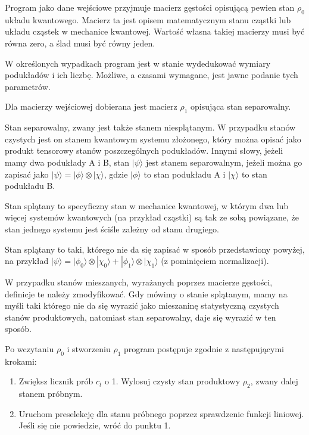 \documentclass[11pt, a4paper]{article}
\begin{document}
\begin{sloppypar}
    Program jako dane wejściowe przyjmuje macierz gęstości opisującą pewien stan $\rho_{0}$
    układu kwantowego. Macierz ta jest opisem matematycznym stanu cząstki lub układu
    cząstek w mechanice kwantowej. Wartość własna takiej macierzy musi być równa zero, a
    ślad musi być równy jeden.

    W określonych wypadkach program jest w stanie wydedukować wymiary podukładów i ich
    liczbę. Możliwe, a czasami wymagane, jest jawne podanie tych parametrów.

    Dla macierzy wejściowej dobierana jest macierz $\rho_{1}$ opisująca stan separowalny.

    Stan separowalny, zwany jest także stanem niesplątanym. W przypadku stanów czystych jest
    on stanem kwantowym systemu złożonego, który można opisać jako produkt tensorowy
    stanów poszczególnych podukładów. Innymi słowy, jeżeli mamy dwa podukłady A i B, stan
    $|\psi \rangle$ jest stanem separowalnym, jeżeli można go zapisać jako
    $|\psi\rangle = |\phi\rangle \otimes |\chi\rangle$, gdzie $| \phi\rangle$ to stan podukładu
    A i $|\chi\rangle$ to stan podukładu B.

    Stan splątany to specyficzny stan w mechanice kwantowej, w którym dwa lub więcej
    systemów kwantowych (na przykład cząstki) są tak ze sobą powiązane, że stan jednego systemu
    jest ściśle zależny od stanu drugiego.

    Stan splątany to taki, którego nie da się zapisać w sposób przedstawiony powyżej, na
    przykład $|\psi\rangle = |\phi_{0}\rangle \otimes |\chi_{0}\rangle + |\phi_{1}\rangle
    \otimes |\chi_{1}\rangle$ (z pominięciem normalizacji).

    W przypadku stanów mieszanych, wyrażanych poprzez macierze gęstości, definicje te należy
    zmodyfikować. Gdy mówimy o stanie splątanym, mamy na myśli taki którego nie da się wyrazić
    jako mieszaninę statystyczną czystych stanów produktowych, natomiast stan
    separowalny, daje się wyrazić w ten sposób.

    Po wczytaniu $\rho_{0}$ i stworzeniu $\rho_{1}$ program postępuje zgodnie z następującymi
    krokami:

    \begin{enumerate}
      \item Zwiększ licznik prób $c_{t}$ o 1. Wylosuj czysty stan produktowy $\rho_{2}$,
        zwany dalej stanem próbnym.

      \item Uruchom preselekcję dla stanu próbnego poprzez sprawdzenie funkcji liniowej.
        Jeśli się nie powiedzie, wróć do punktu 1.


\end{enumerate}
\end{sloppypar}
\end{document}
